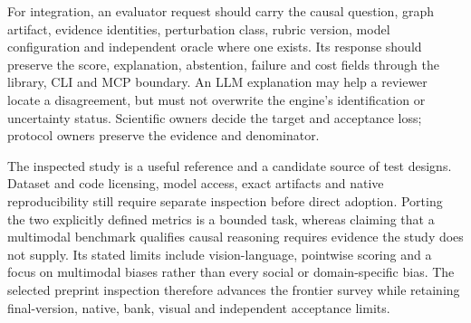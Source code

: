 For integration, an evaluator request should carry the causal question,
graph artifact, evidence identities, perturbation class, rubric version,
model configuration and independent oracle where one exists. Its response
should preserve the score, explanation, abstention, failure and cost fields
through the library, CLI and MCP boundary. An LLM explanation may help a
reviewer locate a disagreement, but must not overwrite the engine's
identification or uncertainty status. Scientific owners decide the target
and acceptance loss; protocol owners preserve the evidence and denominator.
\citep{exec24_judgebias_reference}

The inspected study is a useful reference and a candidate source of test
designs. Dataset and code licensing, model access, exact artifacts and
native reproducibility still require separate inspection before direct
adoption. Porting the two explicitly defined metrics is a bounded task,
whereas claiming that a multimodal benchmark qualifies causal reasoning
requires evidence the study does not supply. Its stated limits include
vision-language, pointwise scoring and a focus on multimodal biases rather
than every social or domain-specific bias. The selected preprint inspection
therefore advances the frontier survey while retaining final-version,
native, bank, visual and independent acceptance limits.
\citep{exec24_judgebias_original,exec24_judgebias_reference}
